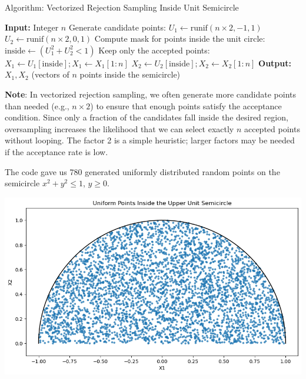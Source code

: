 \documentclass[8pt]{beamer}
\begin{document}
\begin{frame}[fragile]{Algorithm: Vectorized Rejection Sampling Inside Unit Semicircle}
\begin{algorithm}[H]
    \caption{Generate $n$ points $(X_1, X_2)$ uniformly inside the semicircle (vectorized)}
    \begin{algorithmic}[1]
        \State \textbf{Input:} Integer $n$
        \State Generate candidate points:
        \Statex \quad $U_1 \gets \text{runif}(n \times 2, -1, 1)$
        \Statex \quad $U_2 \gets \text{runif}(n \times 2, 0, 1)$
        \State Compute mask for points inside the unit circle:
        \Statex \quad $\text{inside} \gets (U_1^2 + U_2^2 < 1)$
        \State Keep only the accepted points:
        \Statex \quad $X_1 \gets U_1[\text{inside}]; X_1 \gets X_1[1:n]$
        \Statex \quad $X_2 \gets U_2[\text{inside}]; X_2 \gets X_2[1:n]$
        \State \textbf{Output:} $X_1, X_2$ (vectors of $n$ points inside the semicircle)
    \end{algorithmic}
\end{algorithm}

\textbf{Note}: In vectorized rejection sampling, we often generate more candidate points than needed (e.g., $n\times 2$) to ensure that enough points satisfy the acceptance condition. Since only a fraction of the candidates fall inside the desired region, oversampling increases the likelihood that we can select exactly $n$ accepted points without looping. The factor 2 is a simple heuristic; larger factors may be needed if the acceptance rate is low.
\end{frame}

\begin{frame}
The code gave us 780 generated uniformly distributed random points on the semicircle $x^2+y^2\leq 1$, $y\geq 0$. 

\begin{center}
\includegraphics[scale=0.5]{chapter1-part4-plot3.png}
\end{center}
\end{frame}
\end{document}
